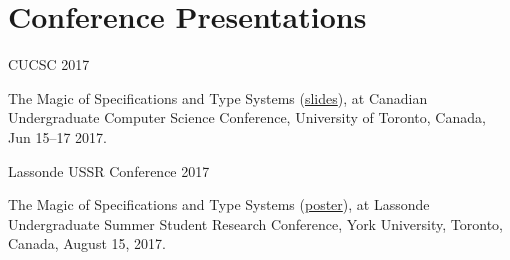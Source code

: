 \documentclass[12pt,letterpaper]{article}
\renewenvironment{itemize}{
  \begin{list}{}{
    \setlength{\leftmargin}{1.5em}
    \setlength{\itemsep}{0.25em}
    \setlength{\parskip}{0pt}
    \setlength{\parsep}{0.25em}
  }
}{
  \end{list}
}
\begin{document}
\section*{Conference Presentations}

\begin{itemize}
\item {\large \tallnums CUCSC 2017}

  \begin{itemize}
  \item {\largersans The Magic of Specifications and Type Systems}
    (\href{https://static.aminb.org/cucsc-2017-slides.pdf}{slides}),
    at Canadian Undergraduate Computer Science Conference, University of
    Toronto, Canada, Jun 15--17 2017.
  \end{itemize}

\item {\large \tallnums Lassonde USSR Conference 2017}

  \begin{itemize}
  \item {\largersans The Magic of Specifications and Type Systems}
    (\href{https://static.aminb.org/eecs4080-poster.pdf}{poster}),
    at Lassonde Undergraduate Summer Student Research Conference, York University,
    Toronto, Canada, August 15, 2017.
  \end{itemize}

\end{itemize}
\end{document}
